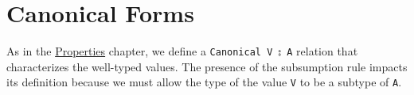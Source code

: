 \hypertarget{canonical-forms}{%
\section{Canonical Forms}\label{canonical-forms}}

As in the \protect\hyperlink{Properties}{Properties} chapter, we define
a \texttt{Canonical\ V\ ⦂\ A} relation that characterizes the well-typed
values. The presence of the subsumption rule impacts its definition
because we must allow the type of the value \texttt{V} to be a subtype
of \texttt{A}.

\begin{fence}
\begin{code}%
\>[0]\AgdaSpace{}%
\AgdaSpace{}%
\AgdaSymbol{:}\AgdaSpace{}%
\AgdaSpace{}%
\AgdaSpace{}%
\AgdaSpace{}%
\AgdaSpace{}%
\AgdaSpace{}%
\<%
\\
%
\\[\AgdaEmptyExtraSkip]%
\>[0][@{}l@{\AgdaIndent{0}}]%
\>[2]\AgdaSpace{}%
\AgdaSymbol{:}\AgdaSpace{}%
\AgdaSpace{}%
\AgdaSymbol{\{}\AgdaSpace{}%
\AgdaSpace{}%
\AgdaSpace{}%
\AgdaSpace{}%
\AgdaSymbol{\}}\<%
\\
\>[2][@{}l@{\AgdaIndent{0}}]%
\>[4]%
\>[7]\AgdaSpace{}%
\AgdaOperator{\AgdaInductiveConstructor{,}}\AgdaSpace{}%
\AgdaSpace{}%
\AgdaSpace{}%
\AgdaSpace{}%
\AgdaSpace{}%
\<%
\\
%
\>[4]%
\>[2030I]\AgdaSpace{}%
\AgdaSpace{}%
\AgdaSpace{}%
\AgdaOperator{\AgdaDatatype{<:}}\AgdaSpace{}%
\AgdaSpace{}%
\AgdaSpace{}%
\<%
\\
\>[.][@{}l@{}]\<[2030I]%
\>[6]\AgdaComment{-------------------------}\<%
\\
%
\>[4]\AgdaSpace{}%
\AgdaSpace{}%
\AgdaSymbol{(}\AgdaSpace{}%
\AgdaSymbol{)}\AgdaSpace{}%
\AgdaSpace{}%
\AgdaSymbol{(}\AgdaSpace{}%

\end{code}
\end{fence}
